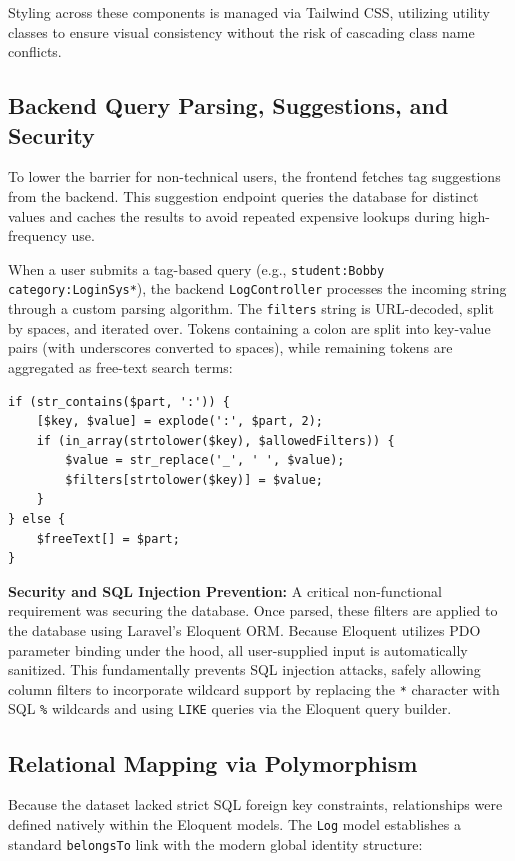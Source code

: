 Styling across these components is managed via Tailwind CSS, utilizing utility classes to ensure visual consistency without the risk of cascading class name conflicts.

\subsection{Backend Query Parsing, Suggestions, and Security}
To lower the barrier for non-technical users, the frontend fetches tag suggestions from the backend. This suggestion endpoint queries the database for distinct values and caches the results to avoid repeated expensive lookups during high-frequency use.

When a user submits a tag-based query (e.g., \texttt{student:Bobby category:LoginSys*}), the backend \texttt{LogController} processes the incoming string through a custom parsing algorithm. The \texttt{filters} string is URL-decoded, split by spaces, and iterated over. Tokens containing a colon are split into key-value pairs (with underscores converted to spaces), while remaining tokens are aggregated as free-text search terms:

\begin{verbatim}
if (str_contains($part, ':')) {
    [$key, $value] = explode(':', $part, 2);
    if (in_array(strtolower($key), $allowedFilters)) {
        $value = str_replace('_', ' ', $value);
        $filters[strtolower($key)] = $value;
    }
} else {
    $freeText[] = $part;
}
\end{verbatim}

\textbf{Security and SQL Injection Prevention:} A critical non-functional requirement was securing the database. Once parsed, these filters are applied to the database using Laravel's Eloquent ORM. Because Eloquent utilizes PDO parameter binding under the hood, all user-supplied input is automatically sanitized. This fundamentally prevents SQL injection attacks, safely allowing column filters to incorporate wildcard support by replacing the \texttt{*} character with SQL \texttt{\%} wildcards and using \texttt{LIKE} queries via the Eloquent query builder.

\subsection{Relational Mapping via Polymorphism}
Because the dataset lacked strict SQL foreign key constraints, relationships were defined natively within the Eloquent models. The \texttt{Log} model establishes a standard \texttt{belongsTo} link with the modern global identity structure:

